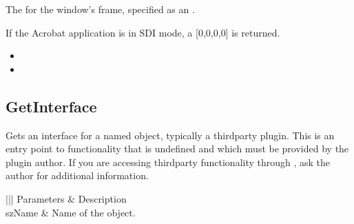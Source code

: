 \documentclass[letterpaper,12pt,english,openany,oneside]{sphinxmanual}
\begin{document}

The  for the window’s frame, specified as an .

If the Acrobat application is in SDI mode, a {[}0,0,0,0{]}  is returned.

\label{\detokenize{IAC_API_OLE_Objects:related-methods-5}}
\begin{itemize}
\item {} 
 

\item {} 
 

\end{itemize}




\subsection{GetInterface}
\label{\detokenize{IAC_API_OLE_Objects:getinterface}}
Gets an  interface for a named object, typically a third\sphinxhyphen{}party plug\sphinxhyphen{}in. This is an entry point to functionality that is undefined and which must be provided by the plug\sphinxhyphen{}in author. If you are accessing third\sphinxhyphen{}party functionality through , ask the author for additional information.


\begin{sphinxVerbatim}[commandchars=\\\{\}]
   
\end{sphinxVerbatim}
\label{\detokenize{IAC_API_OLE_Objects:parameters-1}}


\begin{savenotes}\sphinxattablestart
\centering
{}\label{\detokenize{IAC_API_OLE_Objects:section-3}}\nobreak
\begin{tabular}[t]{|||}
\hline
\sphinxstyletheadfamily 
Parameters
&\sphinxstyletheadfamily 
Description
\\
\hline
szName
&
Name of the object.
\\
\hline
\end{tabular}
\par
\sphinxattableend\end{savenotes}
\end{document}
